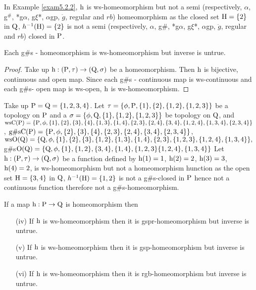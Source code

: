 \begin{exm}\label{exam5.2.3}
In Example \ref{exam5.2.2}, $\mathrm{h}$ is ws-homeomorphism but not a semi (respectively, $\alpha$, g$^{\#}$, *g$\alpha$, g$\xi$*, $\alpha$gp, $\ddot{g}$, regular and $rb$) homeomorphism as the closed set $\mathrm{H}=\{2\}$ in $\mathrm{Q}$, $h^{-1} (\mathrm{H})=\{2\}$ is not a semi (respectively, $\alpha$, g\#, *g$\alpha$, g$\xi$*, $\alpha$gp, $\ddot{g}$, regular and $rb$) closed in $\mathrm{P}$.
\end{exm}

\begin{thm}\label{thm5.2.3}
Each g\#s - homeomorphism is ws-homeomorphism but inverse is untrue.
\end{thm}

\begin{proof}
Take up $\mathrm{h}: (\mathrm{P}, \tau) \to (\mathrm{Q}, \sigma)$ be a homeomorphism. Then $\mathrm{h}$ is bijective, continuous and open map. Since each g\#s - continuous map is ws-continuous and each g\#s- open map is ws-open, $\mathrm{h}$ is ws-homeomorphism.
\end{proof}

\begin{exm}\label{exam5.2.4}
Take up $\mathrm{P}=\mathrm{Q}= \{1, 2, 3, 4\}$. Let $\tau= \{\phi, \TSP, \{1\}, \{2\}, \{1, 2\},\break \{1,2,3\}\}$ be a topology on $\mathrm{P}$ and a $\sigma=\{\phi,\mathrm{Q},\{1\},\{1,2\},\{1,2,3\}\}$ be topology on $\mathrm{Q}$, and $\ws\TSC(\TSP)=\{\TSP,\phi,\{1\},\{2\},\{3\},\{4\},\{1,3\},\{1,4\},\{2,3\},\{2,4\},\{3,4\},\{1,2,4\},\break \{1,3,4\},\{2,3,4\}\}$, $\text{g\#s}\mathrm{C}(\mathrm{P})=\{\mathrm{P}, \phi,\{2\},\{3\},\{4\},\{2,3\},\{2,4\},\{3,4\},\{2,3,4\}\}$,\break $\mathrm{ws}\mathrm{O}(\mathrm{Q})=\{\mathrm{Q}, \phi, \{1\},\{2\},\{3\},\{1,2\}, \{1,3\},\{1,4\},\{2,3\},\{1,2,3\}, \{1,2,4\}, \{1,3,4\}\},$ g\#s$\mathrm{O}(\mathrm{Q})=\{\mathrm{Q},\phi,\{1\},\{1,2\},\{3,4\},\{1,4\},\{1,2,3\}\{1,2,4\},\{1,3,4\}\}$ Let $\TSh: (\TSP, \tau )\break \to (\TSQ, \sigma)$ be a function defined by $\mathrm{h}(1)= 1$, $\mathrm{h}(2)=2$, $\mathrm{h}(3)=3$, $\mathrm{h}(4)=2$, is ws-homeomorphism but not a homeomorphism hunction as the open set $\mathrm{H}=\{3,4\}$ in $\mathrm{Q}$, $h^{-1} (\mathrm{H})=\{1,2\}$ is not a g\#s-closed in $\mathrm{P}$ hence not a continuous function therefore not a g\#s-homeomorphism.
\end{exm}

\begin{thm}\label{thm5.2.4}
If a map $\mathrm{h}: \mathrm{P}\to \mathrm{Q}$ is homeomorphism then
\begin{itemize}
\item[(iv)] If $\mathrm{h}$ is ws-homeomorphism then it is gspr-homeomorphism but inverse is untrue.
\item[(v)] If $\mathrm{h}$ is ws-homeomorphism then it is gsp-homeomorphism but inverse is untrue.
\item[(vi)] If $\mathrm{h}$ is ws-homeomorphism then it is rgb-homeomorphism but inverse is untrue.
\end{itemize}
\end{thm}

